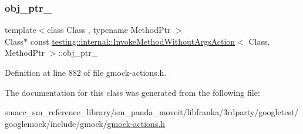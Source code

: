 \subsubsection{\texorpdfstring{obj\+\_\+ptr\+\_\+}{obj\_ptr\_}}
{\footnotesize\ttfamily template$<$class Class , typename Method\+Ptr $>$ \\
Class$\ast$ const \hyperlink{classtesting_1_1internal_1_1InvokeMethodWithoutArgsAction}{testing\+::internal\+::\+Invoke\+Method\+Without\+Args\+Action}$<$ Class, Method\+Ptr $>$\+::obj\+\_\+ptr\+\_\+\hspace{0.3cm}{\ttfamily [private]}}



Definition at line 882 of file gmock-\/actions.\+h.



The documentation for this class was generated from the following file\+:\begin{DoxyCompactItemize}
\item 
smacc\+\_\+sm\+\_\+reference\+\_\+library/sm\+\_\+panda\+\_\+moveit/libfranka/3rdparty/googletest/googlemock/include/gmock/\hyperlink{gmock-actions_8h}{gmock-\/actions.\+h}\end{DoxyCompactItemize}
